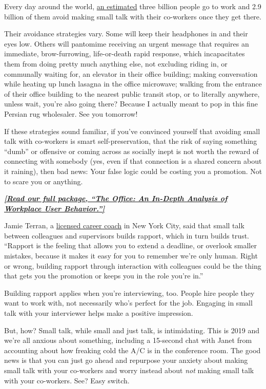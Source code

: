Every day around the world,
\href{http://datatopics.worldbank.org/jobs/}{an estimated} three billion
people go to work and 2.9 billion of them avoid making small talk with
their co-workers once they get there.

Their avoidance strategies vary. Some will keep their headphones in and
their eyes low. Others will pantomime receiving an urgent message that
requires an immediate, brow-furrowing, life-or-death rapid response,
which incapacitates them from doing pretty much anything else, not
excluding riding in, or communally waiting for, an elevator in their
office building; making conversation while heating up lunch lasagna in
the office microwave; walking from the entrance of their office building
to the nearest public transit stop, or to literally anywhere, unless
wait, you're also going there? Because I actually meant to pop in this
fine Persian rug wholesaler. See you tomorrow!

If these strategies sound familiar, if you've convinced yourself that
avoiding small talk with co-workers is smart self-preservation, that the
risk of saying something ``dumb'' or offensive or coming across as
socially inept is not worth the reward of connecting with somebody (yes,
even if that connection is a shared concern about it raining), then bad
news: Your false logic could be costing you a promotion. Not to scare
you or anything.

\textbf{\href{https://www.nytimes.com/interactive/2019/09/17/style/the-office.html}{\emph{{[}Read
our full package, ``The Office: An In-Depth Analysis of Workplace User
Behavior.''{]}}}}

Jamie Terran, a \href{http://jamieterran.com/}{licensed career coach} in
New York City, said that small talk between colleagues and supervisors
builds rapport, which in turn builds trust. ``Rapport is the feeling
that allows you to extend a deadline, or overlook smaller mistakes,
because it makes it easy for you to remember we're only human. Right or
wrong, building rapport through interaction with colleagues could be the
thing that gets you the promotion or keeps you in the role you're in.''

Building rapport applies when you're interviewing, too. People hire
people they want to work with, not necessarily who's perfect for the
job. Engaging in small talk with your interviewer helps make a positive
impression.

But, how? Small talk, while small and just talk, is intimidating. This
is 2019 and we're all anxious about something, including a 15-second
chat with Janet from accounting about how freaking cold the A/C is in
the conference room. The good news is that you can just go ahead and
repurpose your anxiety about making small talk with your co-workers and
worry instead about \emph{not} making small talk with your co-workers.
See? Easy switch.

